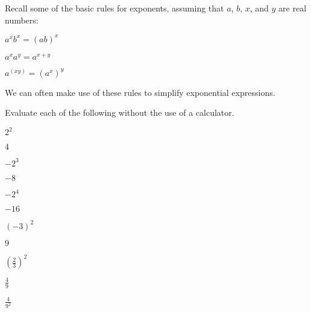 \begin{pccspecialcomment}
	Recall some of the basic rules for exponents, assuming that $a$, $b$, $x$,
	and $y$ are real numbers:
	\begin{props}
		\item\label{exp:prop:pow} $a^xb^x=(ab)^x$ 
		\item\label{exp:prop:add} $a^xa^y =a^{x+y}$
		\item\label{exp:prop:mult} $a^{(xy)} = (a^x)^y$
	\end{props}
\end{pccspecialcomment}
We can often make use of these rules to simplify exponential expressions.
\begin{essentialskills}
	\begin{problem}
	Evaluate each of the following without the use of a calculator. 
	\begin{multicols}{4}
		\begin{subproblem}
			$2^2$ 
			\begin{shortsolution}
				$4$ 
			\end{shortsolution}
		\end{subproblem}
		\begin{subproblem}
			$-2^3$ 
			\begin{shortsolution}
				$-8$ 
			\end{shortsolution}
		\end{subproblem}
		\begin{subproblem}
			$-2^4$ 
			\begin{shortsolution}
				$-16$ 
			\end{shortsolution}
		\end{subproblem}
		\begin{subproblem}
			$(-3)^2$     
			\begin{shortsolution}
				$9$
			\end{shortsolution}
		\end{subproblem}
		\begin{subproblem}
			$\left( \frac{2}{3} \right)^2$
			\begin{shortsolution}
				$\frac{4}{9}$ 
			\end{shortsolution}
		\end{subproblem}
		\begin{subproblem}
			$ \frac{4}{9^2}$ 
			\begin{shortsolution}

\end{shortsolution}
\end{subproblem}
\end{multicols}
\end{problem}
\end{essentialskills}
